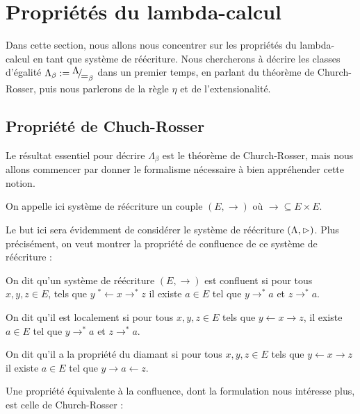 \section{Propriétés du lambda-calcul}

Dans cette section, nous allons nous concentrer sur les propriétés du lambda-calcul en tant que système de réécriture. Nous chercherons à décrire les classes d'égalité $\Lambda_\beta := \quot{\Lambda}{\beteq}$ dans un premier temps, en parlant du théorème de Church-Rosser, puis nous parlerons de la règle $\eta$ et de l'extensionalité.

\subsection{Propriété de Chuch-Rosser}

Le résultat essentiel pour décrire $\Lambda_\beta$ est le théorème de Church-Rosser, mais nous allons commencer par donner le formalisme nécessaire à bien appréhender cette notion.

\begin{defi}
    On appelle ici système de réécriture un couple $(E,\to)$ où $\to\subseteq E\times E$.
\end{defi}

Le but ici sera évidemment de considérer le système de réécriture $(\Lambda,\rhd)$. Plus précisément, on veut montrer la propriété de confluence de ce système de réécriture :

\begin{defi}
    On dit qu'un système de réécriture $(E,\to)$ est confluent si pour tous $x,y,z\in E$, tels que $y\;^*\!\!\leftarrow x \rightarrow^* z$ il existe $a\in E$ tel que $y\to^* a$ et $z\to^* a$.

    On dit qu'il est localement si pour tous $x,y,z\in E$ tels que $y\leftarrow x \rightarrow z$, il existe $a\in E$ tel que $y\to^* a$ et $z\to^* a$.

    On dit qu'il a la propriété du diamant si pour tous $x,y,z\in E$ tels que $y\leftarrow x \rightarrow z$ il existe $a\in E$ tel que $y\rightarrow a \leftarrow z$.
\end{defi}


Une propriété équivalente à la confluence, dont la formulation nous intéresse plus, est celle de Church-Rosser :

